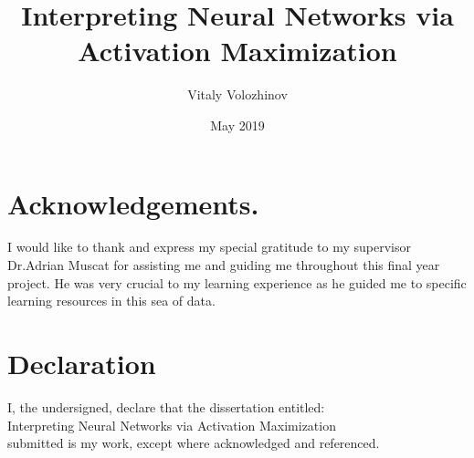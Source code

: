 \documentclass{csfyp}
\title{Interpreting Neural Networks via Activation Maximization}
\author{Vitaly Volozhinov}
\date{May 2019}
\newcommand\tab[1][1cm]{\hspace*{#1}}
\begin{document}
\section*{Acknowledgements.}
I would like to thank and express my special gratitude to my supervisor Dr.Adrian Muscat for assisting me and guiding me throughout this final year project. He was very crucial to my learning experience as he guided me to specific learning resources in this sea of data.
\section*{Declaration}
I, the undersigned, declare that the dissertation entitled:
\\
\tab Interpreting Neural Networks via Activation Maximization
\\
submitted is my work, except where acknowledged and referenced.
\newpage

\tableofcontents

\listoffigures
\newpage
\listoftables
\printglossaries

\setcounter{page}{1}
\newpage
\end{document}
